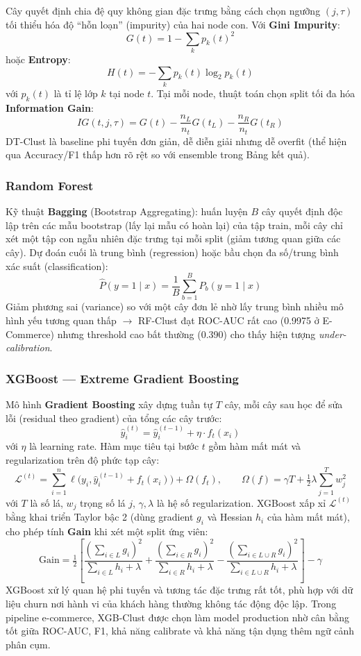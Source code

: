 \documentclass[12pt,a4paper]{article}
\begin{document}
Cây quyết định chia đệ quy không gian đặc trưng bằng cách chọn ngưỡng $(j,\tau)$ tối thiểu hóa độ
``hỗn loạn'' (impurity) của hai node con. Với \textbf{Gini Impurity}:
\[
  G(t) = 1 - \sum_{k} p_k(t)^2
\]
hoặc \textbf{Entropy}:
\[
  H(t) = -\sum_k p_k(t)\log_2 p_k(t)
\]
với $p_k(t)$ là tỉ lệ lớp $k$ tại node $t$. Tại mỗi node, thuật toán chọn split tối đa hóa
\textbf{Information Gain}:
\[
  IG(t, j, \tau) = G(t) - \dfrac{n_L}{n_t}G(t_L) - \dfrac{n_R}{n_t}G(t_R)
\]
DT-Clust là baseline phi tuyến đơn giản, dễ diễn giải nhưng dễ overfit (thể hiện qua Accuracy/F1
thấp hơn rõ rệt so với ensemble trong Bảng kết quả).

\subsubsection{Random Forest}

Kỹ thuật \textbf{Bagging} (Bootstrap Aggregating): huấn luyện $B$ cây quyết định độc lập trên các
mẫu bootstrap (lấy lại mẫu có hoàn lại) của tập train, mỗi cây chỉ xét một tập con ngẫu nhiên đặc
trưng tại mỗi split (giảm tương quan giữa các cây). Dự đoán cuối là trung bình (regression) hoặc
bầu chọn đa số/trung bình xác suất (classification):
\[
  \hat{P}(y=1\mid x) = \dfrac{1}{B}\sum_{b=1}^{B} P_b(y=1\mid x)
\]
Giảm phương sai (variance) so với một cây đơn lẻ nhờ lấy trung bình nhiều mô hình yếu tương quan
thấp $\to$ RF-Clust đạt ROC-AUC rất cao (0.9975 ở E-Commerce) nhưng threshold cao bất thường (0.390)
cho thấy hiện tượng \textit{under-calibration}.

\subsubsection{XGBoost --- Extreme Gradient Boosting}

Mô hình \textbf{Gradient Boosting} xây dựng tuần tự $T$ cây, mỗi cây sau học để sửa lỗi (residual
theo gradient) của tổng các cây trước:
\[
  \hat{y}_i^{(t)} = \hat{y}_i^{(t-1)} + \eta \cdot f_t(x_i)
\]
với $\eta$ là learning rate. Hàm mục tiêu tại bước $t$ gồm hàm mất mát và regularization trên độ
phức tạp cây:
\[
  \mathcal{L}^{(t)} = \sum_{i=1}^n \ell\big(y_i, \hat{y}_i^{(t-1)} + f_t(x_i)\big) + \Omega(f_t),
  \qquad \Omega(f) = \gamma T + \tfrac{1}{2}\lambda \sum_{j=1}^{T} w_j^2
\]
với $T$ là số lá, $w_j$ trọng số lá $j$, $\gamma,\lambda$ là hệ số regularization. XGBoost xấp xỉ
$\mathcal{L}^{(t)}$ bằng khai triển Taylor bậc 2 (dùng gradient $g_i$ và Hessian $h_i$ của hàm mất
mát), cho phép tính \textbf{Gain} khi xét một split ứng viên:
\[
  \text{Gain} = \tfrac{1}{2}\left[\dfrac{(\sum_{i\in L} g_i)^2}{\sum_{i\in L} h_i + \lambda} +
  \dfrac{(\sum_{i\in R} g_i)^2}{\sum_{i\in R} h_i + \lambda} -
  \dfrac{(\sum_{i\in L\cup R} g_i)^2}{\sum_{i\in L\cup R} h_i + \lambda}\right] - \gamma
\]
XGBoost xử lý quan hệ phi tuyến và tương tác đặc trưng rất tốt, phù hợp với dữ liệu churn nơi hành
vi của khách hàng thường không tác động độc lập. Trong pipeline e-commerce, XGB-Clust được chọn làm
model production nhờ cân bằng tốt giữa ROC-AUC, F1, khả năng calibrate và khả năng tận dụng thêm
ngữ cảnh phân cụm.
\end{document}
